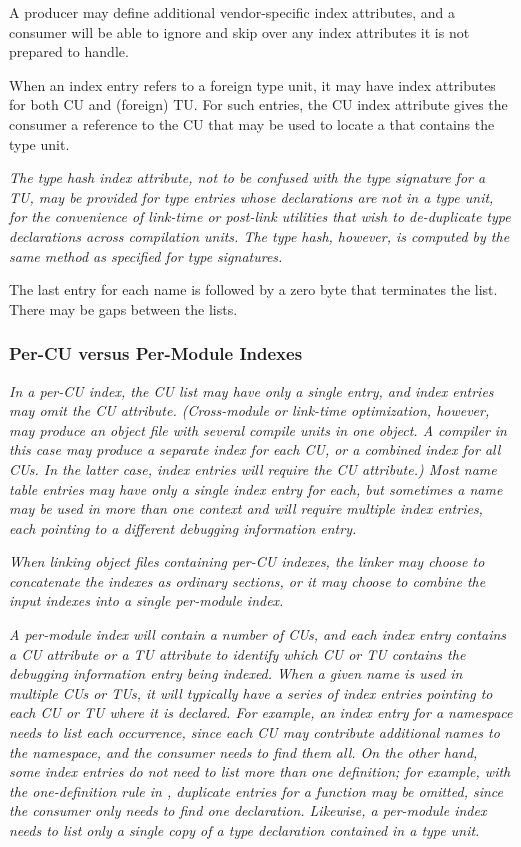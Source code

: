 A producer may define additional vendor-specific 
\bb
index attributes, 
\eb
and a consumer will be able to ignore and skip over any 
\bb
index attributes 
\eb
it is not prepared to handle.

When an index entry refers to a foreign type unit, it may have
\bb
index attributes 
\eb
for both CU and (foreign) TU. For such entries, the CU
\bb
index attribute
\eb
gives the consumer a reference to the CU that may be used to
locate a \splitDWARFobjectfile{} that contains the type unit.

\textit{The type hash
\bb
index attribute, 
\eb
not to be confused with the type signature
for a TU, may be provided for type entries whose declarations are not
in a type unit, for the convenience of link-time or post-link
utilities that wish to de-duplicate type declarations across
compilation units. The type hash, however, is computed by the
same method as specified for type signatures.}

The last entry for each name is followed by a zero byte that
terminates the list. There may be gaps between the lists.

\subsubsection{Per-CU versus Per-Module Indexes}
\label{chap:percuvspermoduleindexes}
\textit{In a per-CU index, the CU list may have only a single entry, 
and index entries may omit the CU 
\bb
attribute. 
\eb
(Cross-module or link-time
optimization, however, may produce an object file with several compile
units in one object. A compiler in this case may produce a separate
index for each CU, or a combined index for all CUs. In the latter
case, index entries will require the CU
\bb
attribute.) 
\eb
Most name table
entries may have only a single index entry for each, but sometimes a
name may be used in more than one context and will require multiple
index entries, each pointing to a different debugging information
entry.}

\textit{When linking object files containing per-CU indexes, the 
linker may choose to concatenate the indexes as ordinary sections, 
or it may choose to combine the input indexes into a single 
per-module index.}

\textit{A per-module index will contain a number of CUs, and each index 
entry contains a CU attribute or a TU attribute to identify which 
CU or TU contains the debugging information entry being indexed. When a
given name is used in multiple CUs or TUs, it will typically have a
series of index entries pointing to each CU or TU where it is declared. 
For example, an index entry for a  namespace needs to
list each occurrence, since each CU may contribute additional names to
the namespace, and the consumer needs to find them all. On the
other hand, some index entries do not need to list more than one
definition; for example, with the one-definition rule in ,
duplicate entries for a function may be omitted, since the consumer
only needs to find one declaration. Likewise, a per-module index needs
to list only a single copy of a type declaration contained in a type
unit.}

